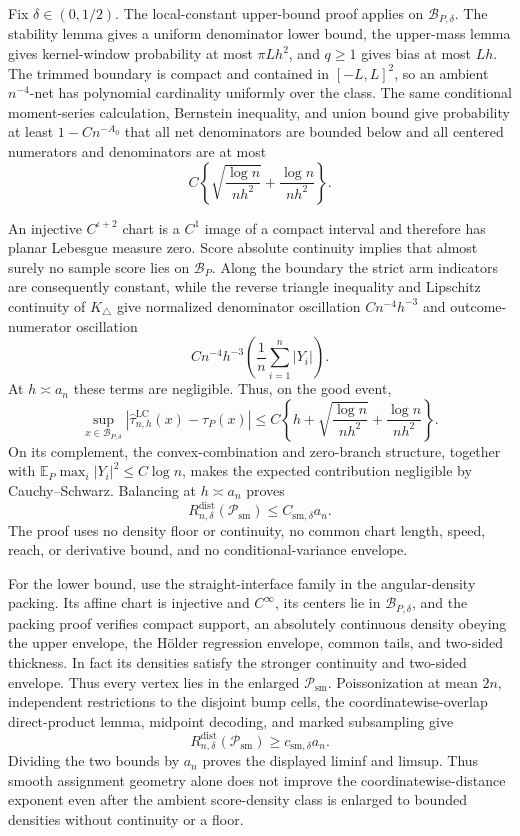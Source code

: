 Fix \(\delta\in(0,1/2)\).  The local-constant upper-bound proof applies on \(\mathcal B_{P,\delta}\).  The stability lemma gives a uniform denominator lower bound, the upper-mass lemma gives kernel-window probability at most \(\pi Lh^2\), and \(q\geq1\) gives bias at most \(Lh\).  The trimmed boundary is compact and contained in \([-L,L]^2\), so an ambient \(n^{-4}\)-net has polynomial cardinality uniformly over the class.  The same conditional moment-series calculation, Bernstein inequality, and union bound give probability at least \(1-Cn^{-A_0}\) that all net denominators are bounded below and all centered numerators and denominators are at most
\[
 C\left\{\sqrt{\frac{\log n}{nh^2}}+\frac{\log n}{nh^2}\right\}.
\]

An injective \(C^{\iota+2}\) chart is a \(C^1\) image of a compact interval and therefore has planar Lebesgue measure zero.  Score absolute continuity implies that almost surely no sample score lies on \(\mathcal B_P\).  Along the boundary the strict arm indicators are consequently constant, while the reverse triangle inequality and Lipschitz continuity of \(K_\triangle\) give normalized denominator oscillation \(Cn^{-4}h^{-3}\) and outcome-numerator oscillation
\[
 Cn^{-4}h^{-3}\left(\frac1n\sum_{i=1}^n|Y_i|\right).
\]
At \(h\asymp a_n\) these terms are negligible.  Thus, on the good event,
\[
 \sup_{x\in\mathcal B_{P,\delta}}
 |\widehat\tau^{\mathrm{LC}}_{n,h}(x)-\tau_P(x)|
 \leq C\left\{h+\sqrt{\frac{\log n}{nh^2}}+\frac{\log n}{nh^2}\right\}.
\]
On its complement, the convex-combination and zero-branch structure, together with \(\mathbb E_P\max_i|Y_i|^2\leq C\log n\), makes the expected contribution negligible by Cauchy--Schwarz.  Balancing at \(h\asymp a_n\) proves
\[
 R_{n,\delta}^{\mathrm{dist}}(\mathcal P_{\mathrm{sm}})
 \leq C_{\mathrm{sm},\delta}a_n.
\]
The proof uses no density floor or continuity, no common chart length, speed, reach, or derivative bound, and no conditional-variance envelope.

For the lower bound, use the straight-interface family in the angular-density packing.  Its affine chart is injective and \(C^\infty\), its centers lie in \(\mathcal B_{P,\delta}\), and the packing proof verifies compact support, an absolutely continuous density obeying the upper envelope, the H\"older regression envelope, common tails, and two-sided thickness.  In fact its densities satisfy the stronger continuity and two-sided envelope.  Thus every vertex lies in the enlarged \(\mathcal P_{\mathrm{sm}}\).  Poissonization at mean \(2n\), independent restrictions to the disjoint bump cells, the coordinatewise-overlap direct-product lemma, midpoint decoding, and marked subsampling give
\[
 R_{n,\delta}^{\mathrm{dist}}(\mathcal P_{\mathrm{sm}})
 \geq c_{\mathrm{sm},\delta}a_n.
\]
Dividing the two bounds by \(a_n\) proves the displayed liminf and limsup.  Thus smooth assignment geometry alone does not improve the coordinatewise-distance exponent even after the ambient score-density class is enlarged to bounded densities without continuity or a floor.